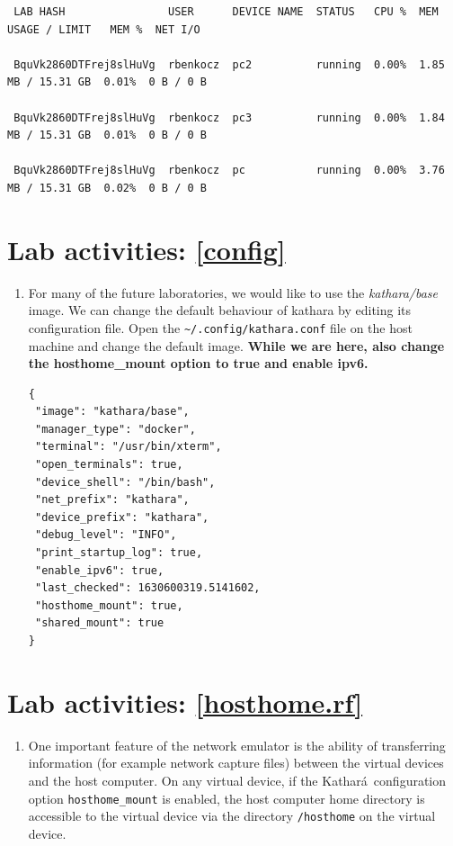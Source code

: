 \documentclass[12pt]{book}
\newcommand{\kathara}{Kathar\'a}
\begin{document}
\begin{enumerate}[label=\arabic*.]
\begin{enumerate}[resume*]
\begin{lstlisting}
 LAB HASH                USER      DEVICE NAME  STATUS   CPU %  MEM USAGE / LIMIT   MEM %  NET I/O   

 BquVk2860DTFrej8slHuVg  rbenkocz  pc2          running  0.00%  1.85 MB / 15.31 GB  0.01%  0 B / 0 B 

 BquVk2860DTFrej8slHuVg  rbenkocz  pc3          running  0.00%  1.84 MB / 15.31 GB  0.01%  0 B / 0 B 

 BquVk2860DTFrej8slHuVg  rbenkocz  pc           running  0.00%  3.76 MB / 15.31 GB  0.02%  0 B / 0 B 

\end{lstlisting}

\end{enumerate}

\section{Lab activities: \ref{config}}

\begin{enumerate}[resume*]
\item For many of the future laboratories, we would like to use the \emph{kathara/base} image. We can change the default behaviour of kathara by editing its configuration file. Open the \verb$~/.config/kathara.conf$ file on the host machine and change the default image. \textbf{While we are here, also change the hosthome\_mount option to true and enable ipv6.}
\begin{lstlisting}
{
 "image": "kathara/base",
 "manager_type": "docker",
 "terminal": "/usr/bin/xterm",
 "open_terminals": true,
 "device_shell": "/bin/bash",
 "net_prefix": "kathara",
 "device_prefix": "kathara",
 "debug_level": "INFO",
 "print_startup_log": true,
 "enable_ipv6": true,
 "last_checked": 1630600319.5141602,
 "hosthome_mount": true,
 "shared_mount": true
}
\end{lstlisting}
\end{enumerate}

\section{Lab activities: \ref{hosthome.rf}}

\begin{enumerate}[resume*]
\item One important feature of the network emulator is the ability of transferring information (for example network capture files) between the virtual devices and the host computer. On any virtual device, if the \kathara\ configuration option \verb$hosthome_mount$ is enabled, the host computer home directory is accessible to the virtual device via the directory \verb$/hosthome$ on the virtual device.


\end{enumerate}
\end{enumerate}
\end{document}
